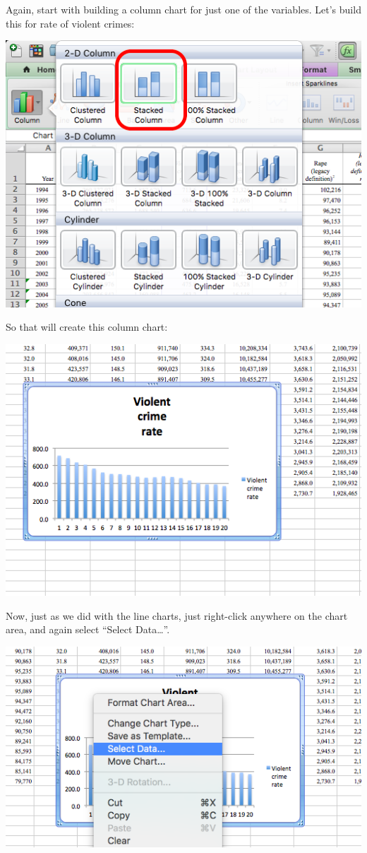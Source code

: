 \documentclass[
]{book}
\begin{document}
Again, start with building a column chart for just one of the variables. Let's build this for rate of violent crimes:

\includegraphics{imgs/stackedbar_1.png}

So that will create this column chart:

\includegraphics{imgs/stackedbar_2.png}

Now, just as we did with the line charts, just right-click anywhere on the chart area, and again select ``Select Data\ldots{}''.

\includegraphics{imgs/stackedbar_3.png}
\end{document}
